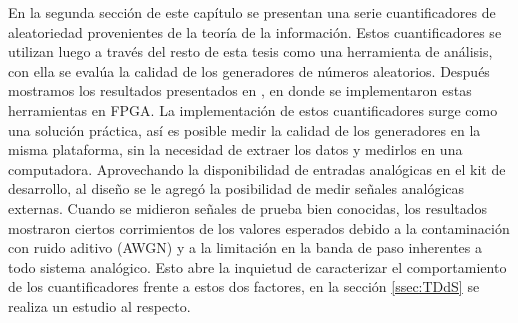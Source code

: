 En la segunda sección de este capítulo se presentan una serie cuantificadores de aleatoriedad provenientes de la teoría de la información.
Estos cuantificadores se utilizan luego a través del resto de esta tesis como una herramienta de análisis, con ella se evalúa la calidad de los generadores de números aleatorios.
Después mostramos los resultados presentados en \cite{CRIA2014}, en donde se implementaron estas herramientas en FPGA.
La implementación de estos cuantificadores surge como una solución práctica, así es posible medir la calidad de los generadores en la misma plataforma, sin la necesidad de extraer los datos y medirlos en una computadora.
Aprovechando la disponibilidad de entradas analógicas en el kit de desarrollo, al diseño se le agregó la posibilidad de medir señales analógicas externas.
Cuando se midieron señales de prueba bien conocidas, los resultados mostraron ciertos corrimientos de los valores esperados debido a la contaminación con ruido aditivo (AWGN) y a la limitación en la banda de paso inherentes a todo sistema analógico.
Esto abre la inquietud de caracterizar el comportamiento de los cuantificadores frente a estos dos factores, en la sección \ref{ssec:TDdS} se realiza un estudio al respecto.